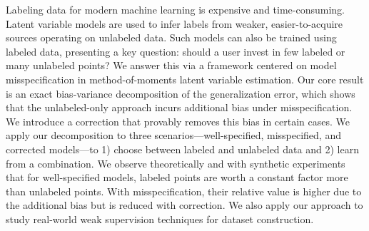 Labeling data for modern machine learning is expensive and time-consuming. Latent variable models are used to infer labels from weaker, easier-to-acquire sources operating on unlabeled data.
Such models can also be trained using labeled data, presenting a key question: should a user invest in few labeled or many unlabeled points? We answer this via a framework centered on model misspecification in method-of-moments latent variable estimation.
%
Our core result is an exact bias-variance decomposition of the generalization error, which shows that the unlabeled-only approach incurs additional bias under misspecification. We introduce a correction that provably removes this bias in certain cases.
%
We apply our decomposition to three scenarios---well-specified, misspecified, and corrected models---to 1) choose between  labeled and unlabeled data and 2) learn from a combination. We observe theoretically and with synthetic experiments that for well-specified models, labeled points are worth a constant factor more than unlabeled points. With misspecification, their relative value is higher due to the additional bias but is reduced with correction. We also apply our approach to study real-world weak supervision techniques for dataset construction.




